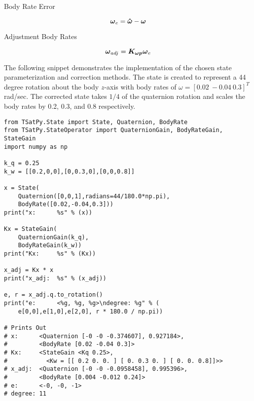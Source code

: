 Body Rate Error

\begin{equation}
  \boldsymbol{\omega}_e = \boldsymbol{\hat{\omega}} - \boldsymbol{\omega}
\end{equation}

Adjustment Body Rates

\begin{equation}
  \boldsymbol{\omega}_{adj} = \boldsymbol{K_{\omega p}} \boldsymbol{\omega}_e
\end{equation}

The following snippet demonstrates the implementation of the chosen state parameterization and correction methods.  The state is created to represent a 44 degree rotation about the body $z$-axis with body rates of $\omega = [0.02 \ -0.04 \ 0.3]^T$ rad/sec.  The corrected state takes $1/4$ of the quaternion rotation and scales the body rates by 0.2, 0.3, and 0.8 respectively.

\begin{singlespace}
  \begin{verbatim}
from TSatPy.State import State, Quaternion, BodyRate
from TSatPy.StateOperator import QuaternionGain, BodyRateGain, StateGain
import numpy as np

k_q = 0.25
k_w = [[0.2,0,0],[0,0.3,0],[0,0,0.8]]

x = State(
    Quaternion([0,0,1],radians=44/180.0*np.pi),
    BodyRate([0.02,-0.04,0.3]))
print("x:      %s" % (x))

Kx = StateGain(
    QuaternionGain(k_q),
    BodyRateGain(k_w))
print("Kx:     %s" % (Kx))

x_adj = Kx * x
print("x_adj:  %s" % (x_adj))

e, r = x_adj.q.to_rotation()
print("e:      <%g, %g, %g>\ndegree: %g" % (
    e[0,0],e[1,0],e[2,0], r * 180.0 / np.pi))

# Prints Out
# x:      <Quaternion [-0 -0 -0.374607], 0.927184>,
#         <BodyRate [0.02 -0.04 0.3]>
# Kx:     <StateGain <Kq 0.25>,
#           <Kw = [[ 0.2 0. 0. ] [ 0. 0.3 0. ] [ 0. 0. 0.8]]>>
# x_adj:  <Quaternion [-0 -0 -0.0958458], 0.995396>,
#         <BodyRate [0.004 -0.012 0.24]>
# e:      <-0, -0, -1>
# degree: 11
  \end{verbatim}
\nocite{minted}
\end{singlespace}
